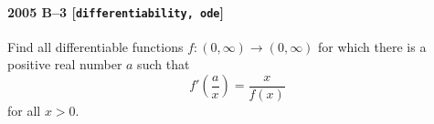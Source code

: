 \paragraph{2005 B--3 \textnormal{[\texttt{differentiability, ode}]}}
Find all differentiable functions $f: (0, \infty) \to (0, \infty)$ for which
there is a positive real number $a$ such that
\[
f' \left( \frac{a}{x} \right) = \frac{x}{f(x)}
\]
for all $x > 0$.
